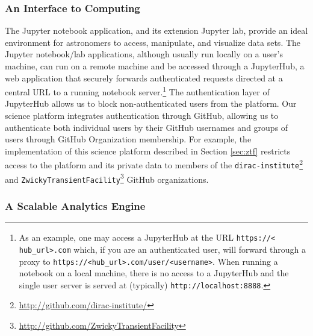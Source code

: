 \documentclass[twocolumn, linenumbers]{aastex631}
\begin{document}
\subsubsection{An Interface to Computing}
\label{sec:interface}

The Jupyter notebook application, and its extension Jupyter lab, provide an ideal environment for astronomers to access, manipulate, and visualize data sets. The Jupyter notebook/lab applications, although usually run locally on a user's machine, can run on a remote machine and be accessed through a JupyterHub, a web application that securely forwards authenticated requests directed at a central URL to a running notebook server.\footnote{As an example, one may access a JupyterHub at the URL \nolinkurl{https://< hub_url>.com} which, if you are an authenticated user, will forward through a proxy to \nolinkurl{https://<hub_url>.com/user/<username>}. When running a notebook on a local machine, there is no access to a JupyterHub and the single user server is served at (typically) \nolinkurl{http://localhost:8888}.} The authentication layer of JupyterHub allows us to block non-authenticated users from the platform. Our science platform integrates authentication through GitHub, allowing us to authenticate both individual users by their GitHub usernames and groups of users through GitHub Organization membership. For example, the implementation of this science platform described in Section \ref{sec:ztf} restricts access to the platform and its private data to members of the \texttt{dirac-institute}\footnote{\url{http://github.com/dirac-institute/}} and \texttt{ZwickyTransientFacility}\footnote{\url{http://github.com/ZwickyTransientFacility}} GitHub organizations.

\subsubsection{A Scalable Analytics Engine}
\label{sec:scalable_analytics}
\end{document}
